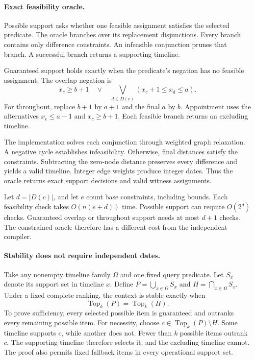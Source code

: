 \paragraph{Exact feasibility oracle.}
Possible support asks whether one feasible assignment satisfies the selected predicate.
The oracle branches over its replacement disjunctions.
Every branch contains only difference constraints.
An infeasible conjunction prunes that branch.
A successful branch returns a supporting timeline.

Guaranteed support holds exactly when the predicate's negation has no feasible assignment.
The overlap negation is
\[
 x_c\ge b+1\quad\lor\quad
 \bigvee_{d\in D(c)}(x_c+1\le x_d\le a).
\]
For throughout, replace $b+1$ by $a+1$ and the final $a$ by $b$.
Appointment uses the alternatives $x_c\le a-1$ and $x_c\ge b+1$.
Each feasible branch returns an excluding timeline.

The implementation solves each conjunction through weighted graph relaxation.
A negative cycle establishes infeasibility.
Otherwise, final distances satisfy the constraints.
Subtracting the zero-node distance preserves every difference and yields a valid timeline.
Integer edge weights produce integer dates.
Thus the oracle returns exact support decisions and valid witness assignments.

Let $d=|D(c)|$, and let $e$ count base constraints, including bounds.
Each feasibility check takes $O(n(e+d))$ time.
Possible support can require $O(2^d)$ checks.
Guaranteed overlap or throughout support needs at most $d+1$ checks.
The constrained oracle therefore has a different cost from the independent compiler.

\paragraph{Stability does not require independent dates.}
Take any nonempty timeline family $\Omega$ and one fixed query predicate.
Let $S_x$ denote its support set in timeline $x$.
Define $P=\bigcup_{x\in\Omega}S_x$ and $H=\bigcap_{x\in\Omega}S_x$.
Under a fixed complete ranking, the context is stable exactly when
\[
 \operatorname{Top}_k(P)=\operatorname{Top}_k(H).
\]
To prove sufficiency, every selected possible item is guaranteed and outranks every remaining possible item.
For necessity, choose $c\in\operatorname{Top}_k(P)\setminus H$.
Some timeline supports $c$, while another does not.
Fewer than $k$ possible items outrank $c$.
The supporting timeline therefore selects it, and the excluding timeline cannot.
The proof also permits fixed fallback items in every operational support set.

